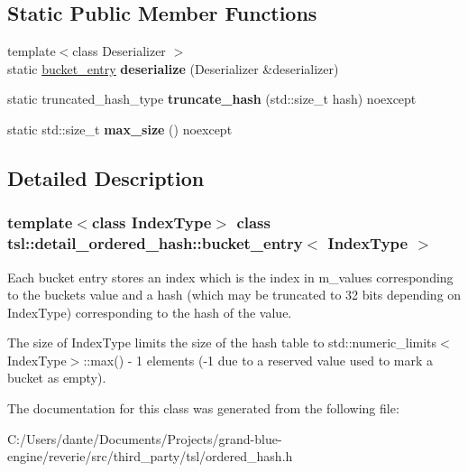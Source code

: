 \subsection*{Static Public Member Functions}
\begin{DoxyCompactItemize}
\item 
\mbox{\label{classtsl_1_1detail__ordered__hash_1_1bucket__entry_a70dea086db20aa8418fcb0514b90bb47}} 
{\footnotesize template$<$class Deserializer $>$ }\\static \mbox{\hyperlink{classtsl_1_1detail__ordered__hash_1_1bucket__entry}{bucket\+\_\+entry}} {\bfseries deserialize} (Deserializer \&deserializer)
\item 
\mbox{\label{classtsl_1_1detail__ordered__hash_1_1bucket__entry_a72745ca4ede0207b69b89bdec7415741}} 
static truncated\+\_\+hash\+\_\+type {\bfseries truncate\+\_\+hash} (std\+::size\+\_\+t hash) noexcept
\item 
\mbox{\label{classtsl_1_1detail__ordered__hash_1_1bucket__entry_a4e8c683675e1c4a9f3311a5b1fa38568}} 
static std\+::size\+\_\+t {\bfseries max\+\_\+size} () noexcept
\end{DoxyCompactItemize}


\subsection{Detailed Description}
\subsubsection*{template$<$class Index\+Type$>$\newline
class tsl\+::detail\+\_\+ordered\+\_\+hash\+::bucket\+\_\+entry$<$ Index\+Type $>$}

Each bucket entry stores an index which is the index in m\+\_\+values corresponding to the bucket\textquotesingle{}s value and a hash (which may be truncated to 32 bits depending on Index\+Type) corresponding to the hash of the value.

The size of Index\+Type limits the size of the hash table to std\+::numeric\+\_\+limits$<$\+Index\+Type$>$\+::max() -\/ 1 elements (-\/1 due to a reserved value used to mark a bucket as empty). 

The documentation for this class was generated from the following file\+:\begin{DoxyCompactItemize}
\item 
C\+:/\+Users/dante/\+Documents/\+Projects/grand-\/blue-\/engine/reverie/src/third\+\_\+party/tsl/ordered\+\_\+hash.\+h\end{DoxyCompactItemize}
